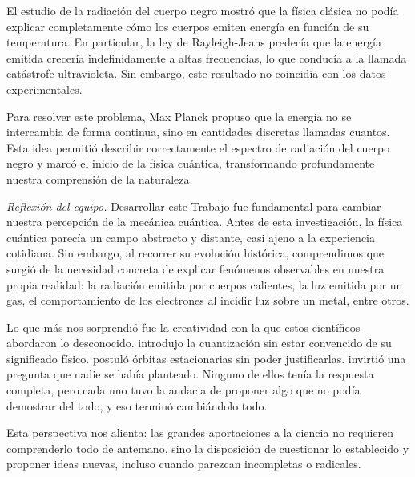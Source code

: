 \documentclass[11pt,a4paper,spanish]{book}
\begin{document}
El estudio de la radiación del cuerpo negro mostró que la física
clásica no podía explicar completamente cómo los cuerpos emiten
energía en función de su temperatura. En particular, la ley de
Rayleigh-Jeans predecía que la energía emitida crecería
indefinidamente a altas frecuencias, lo que conducía a la llamada
catástrofe ultravioleta. Sin embargo, este resultado no coincidía con
los datos experimentales.

Para resolver este problema, Max Planck propuso que la energía no se
intercambia de forma continua, sino en cantidades discretas llamadas
cuantos. Esta idea permitió describir correctamente el espectro de
radiación del cuerpo negro y marcó el inicio de la física cuántica,
transformando profundamente nuestra comprensión de la naturaleza.


\textit{Reflexión del equipo.}
Desarrollar este Trabajo fue fundamental para cambiar nuestra
percepción de la mecánica cuántica. Antes de esta investigación, la
física cuántica parecía un campo abstracto y distante, casi ajeno a
la experiencia cotidiana. Sin embargo, al recorrer su evolución
histórica, comprendimos que surgió de la necesidad concreta de
explicar fenómenos observables en nuestra propia realidad: la
radiación emitida por cuerpos calientes, la luz emitida por un gas,
el comportamiento de los electrones al incidir luz sobre un metal,
entre otros.

Lo que más nos sorprendió fue la creatividad con la que estos
científicos abordaron lo desconocido. \cite{planck1900} introdujo la
cuantización sin estar convencido de su significado
físico. \cite{bohr1913} postuló órbitas estacionarias sin poder
justificarlas. \cite{debroglie1924} invirtió una pregunta que nadie
se había planteado. Ninguno de ellos tenía la respuesta completa,
pero cada uno tuvo la audacia de proponer algo que no podía demostrar
del todo, y eso terminó cambiándolo todo.

Esta perspectiva nos alienta: las grandes aportaciones a la ciencia
no requieren comprenderlo todo de antemano, sino la disposición de
cuestionar lo establecido y proponer ideas nuevas, incluso cuando
parezcan incompletas o radicales.
\end{document}
